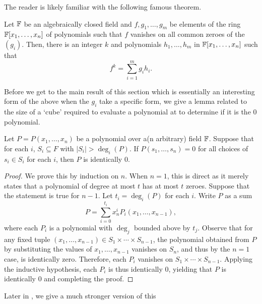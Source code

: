 	The reader is likely familiar with the following famous theorem.

	\begin{ftheo}
		Let $\mathbb{F}$ be an algebraically closed field and $f,g_1,\ldots,g_m$ be elements of the ring $\mathbb{F}[x_1,\ldots,x_n]$ of polynomials such that $f$ vanishes on all common zeroes of the $(g_i)$. Then, there is an integer $k$ and polynomials $h_1,\ldots,h_m$ in $\mathbb{F}[x_1,\ldots,x_n]$ such that
		\[ f^k = \sum_{i=1}^{m} g_i h_i. \]
	\end{ftheo}

	Before we get to the main result of this section which is essentially an interesting form of the above when the $g_i$ take a specific form, we give a lemma related to the size of a `cube' required to evaluate a polynomial at to determine if it is the $0$ polynomial.

	\begin{lemma}
		\label{lem: comb null lem}
		Let $P = P(x_1,\ldots,x_n)$ be a polynomial over a(n arbitrary) field $\mathbb{F}$. Suppose that for each $i$, $S_i \subseteq F$ with $|S_i| > \deg_i(P)$. If $P(s_1,\ldots,s_n) = 0$ for all choices of $s_i \in S_i$ for each $i$, then $P$ is identically $0$. 
	\end{lemma}
	\begin{proof}
		We prove this by induction on $n$. When $n=1$, this is direct as it merely states that a polynomial of degree at most $t$ has at most $t$ zeroes. Suppose that the statement is true for $n-1$. Let $t_i = \deg_i(P)$ for each $i$. Write $P$ as a sum
		\[ P = \sum_{i=0}^{t_i} x_n^i P_i(x_1,\ldots,x_{n-1}), \]
		where each $P_i$ is a polynomial with $\deg_j$ bounded above by $t_j$. Observe that for any fixed tuple $(x_1,\ldots,x_{n-1}) \in S_1 \times \cdots \times S_{n-1}$, the polynomial obtained from $P$ by substituting the values of $x_1,\ldots,x_{n-1}$ vanishes on $S_n$, and thus by the $n=1$ case, is identically zero. Therefore, each $P_i$ vanishes on $S_1 \times \cdots \times S_{n-1}$. Applying the inductive hypothesis, each $P_i$ is thus identically $0$, yielding that $P$ is identically $0$ and completing the proof.
	\end{proof}

	Later in , we give a much stronger version of this

